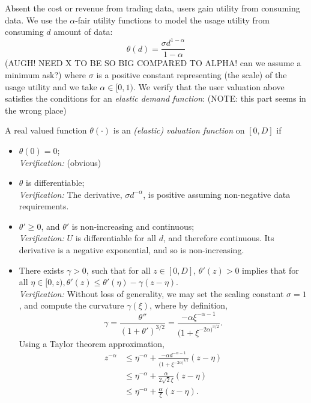 \documentclass[12pt]{article}
\theoremstyle{definition}
\begin{document}
\begin{multicols}{2}
Absent the cost or revenue from trading data, users gain utility from consuming
data. We use the $\alpha$-fair utility functions \cite{zheng} to model the
usage utility from consuming $d$ amount of data:
\begin{equation}
    \theta(d) = \frac{\sigma d^{1-\alpha}}{1-\alpha}
\end{equation}
(AUGH! NEED X TO BE SO BIG COMPARED TO ALPHA! can we assume a minimum ask?)
where $\sigma$ is a positive constant representing (the scale) of the usage
utility and we take $\alpha \in [0, 1)$.
We verify that the user valuation above satisfies the conditions for an
\emph{elastic demand function}: (NOTE: this part seems in the wrong place)

A real valued function $\theta(\cdot)$ is an \emph{(elastic) valuation
function} on $[0, D]$ if 
\begin{itemize}
    \item $\theta(0) = 0$; \\
        \emph{Verification:} (obvious)
    \item $\theta$ is differentiable; \\
        \emph{Verification:} The derivative, $\sigma d^{-\alpha}$, is positive assuming non-negative
data requirements.
    \item $\theta ' \ge 0$, and $\theta '$ is non-increasing and continuous; \\
        \emph{Verification:} $U$ is differentiable for all $d$, and therefore
continuous. Its derivative is a negative exponential, and so is non-increasing.
    \item There exists $\gamma > 0$, such that for all $z \in [0,D]$, $\theta
'(z) > 0$ implies that for all $\eta \in [0, z), \theta '(z) \le \theta '(\eta)
- \gamma(z - \eta)$. \\
        \emph{Verification:} Without loss of generality, we may set the scaling
constant $\sigma=1$, and compute the curvature $\gamma(\xi)$, where by definition,
$$
    \gamma = \frac{\theta''}{(1+\theta')^{3/2}} = \frac{-\alpha
\xi^{-\alpha-1}}{(1+\xi^{-2\alpha)^{3/2}}}.
$$
Using a Taylor theorem approximation,
\begin{align*}
    z^{-\alpha} &\le \eta^{-\alpha} + \frac{-\alpha
d^{-\alpha-1}}{(1+\xi^{-2\alpha)^{3/2}}}(z-\eta) \\
    & \le \eta^{-\alpha} +
\frac{\alpha}{2\sqrt{2} \xi}(z-\eta)  \\
    &\le \eta^{-\alpha} +
\frac{\alpha}{\xi}(z-\eta).
\end{align*}

\end{itemize}
\end{multicols}
\end{document}
